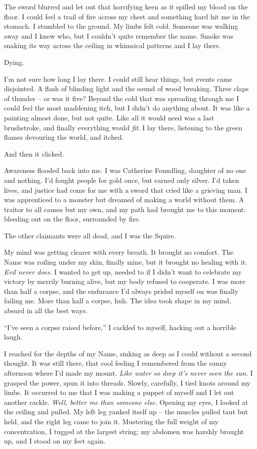 \documentclass[12pt, openany]{book}
\begin{document}
The sword blurred and let out that horrifying keen as it spilled my blood on the floor. I could feel a trail of fire across my chest and something hard hit me in the stomach. I stumbled to the ground. My limbs felt cold. Someone was walking away and I knew who, but I couldn’t quite remember the name. Smoke was snaking its way across the ceiling in whimsical patterns and I lay there.

Dying.

I’m not sure how long I lay there. I could still hear things, but events came disjointed. A flash of blinding light and the sound of wood breaking. Three claps of thunder – or was it five? Beyond the cold that was spreading through me I could feel the most maddening itch, but I didn’t do anything about. It was like a painting almost done, but not quite. Like all it would need was a last brushstroke, and finally everything would \textit{fit}. I lay there, listening to the green flames devouring the world, and itched.

And then it clicked.

Awareness flooded back into me. I was Catherine Foundling, daughter of no one and nothing. I’d fought people for gold once, but earned only silver. I’d taken lives, and justice had come for me with a sword that cried like a grieving man. I was apprenticed to a monster but dreamed of making a world without them. A traitor to all causes but my own, and my path had brought me to this moment: bleeding out on the floor, surrounded by fire.

The other claimants were all dead, and I was the Squire.

My mind was getting clearer with every breath. It brought no comfort. The Name was roiling under my skin, finally mine, but it brought no healing with it. \textit{Evil never does.} I wanted to get up, needed to if I didn’t want to celebrate my victory by merrily burning alive, but my body refused to cooperate. I was more than half a corpse, and the endurance I’d always prided myself on was finally failing me. More than half a corpse, huh. The idea took shape in my mind, absurd in all the best ways.

“I’ve seen a corpse raised before,” I cackled to myself, hacking out a horrible laugh.

I reached for the depths of my Name, sinking as deep as I could without a second thought. It was still there, that cool feeling I remembered from the sunny afternoon where I’d made my mount. \textit{Like water so deep it’s never seen the sun.} I grasped the power, spun it into threads. Slowly, carefully, I tied knots around my limbs. It occurred to me that I was making a puppet of myself and I let out another cackle. \textit{Well, better me than someone else.} Opening my eyes, I looked at the ceiling and pulled. My left leg yanked itself up – the muscles pulled taut but held, and the right leg came to join it. Mustering the full weight of my concentration, I tugged at the largest string: my abdomen was harshly brought up, and I stood on my feet again.
\end{document}
